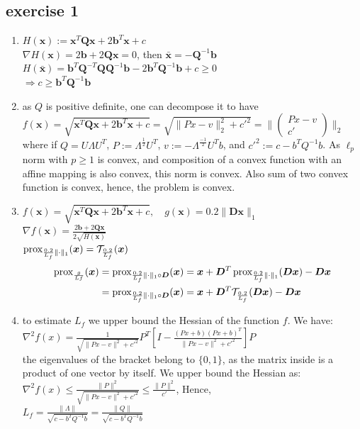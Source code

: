 \subsection{exercise 1}
\begin{enumerate}
    \item $H(\bm x) := \bm x^T \bm Q \bm x + 2 \bm b^T \bm x + c$ \\
    $\nabla H(\bm x) = 2 \bm b + 2 \bm Q \bm x = 0$, then $\bar{\bm x} = - \bm Q^{-1} \bm b$ \\
    $H(\bar{\bm x})=\bm b^T \bm Q^{-T} \bm Q \bm Q^{-1} \bm b - 2 \bm b^T \bm Q^{-1} \bm b + c \geq 0$ \\
    $\Rightarrow c \geq \bm b^T \bm Q^{-1} \bm b$

    \item as $Q$ is positive definite, one can decompose it to have\\
    $f(\bm x) = \sqrt{\bm x^T \bm Q \bm x + 2 \bm b^T \bm x + c} = \sqrt{\|Px - v\|_2^2+ c'^2} = \|\begin{pmatrix}
        Px-v \\
        c'
    \end{pmatrix}\|_2$\\
    where if $Q=U\Lambda U^T$, $P:=\Lambda^{\frac{1}{2}}U^T$, $v:=-\Lambda^{\frac{-1}{2}}U^Tb$, and $c'^2:=c-b^T Q^{-1} b$. As $\ell_p$ norm with $p \geq 1$ is convex, and composition of a convex function with an affine mapping is also convex, this norm is convex. Also sum of two convex function is convex, hence, the problem is convex.
    
    \item $f(\bm x) = \sqrt{\bm x^T \bm Q \bm x + 2 \bm b^T \bm x + c}, \quad g(\bm x) = 0.2 \|\bm D \bm x\|_1$\\
    $\nabla f(\bm x) = \frac{2 \bm b + 2 \bm Q \bm x}{2 \sqrt{H(\bm x)}}$\\
    $\operatorname{prox}_{\frac{0.2}{L_f} \|\cdot\|_1}(\bm x) = \mathcal{T}_{\frac{0.2}{L_f}}(\bm x)$
    \begin{align*}
        \operatorname{prox}_{\frac{g}{Lf}}(\bm x) &= \operatorname{prox}_{\frac{0.2}{L_f}\|\cdot\|_1 \circ \bm D}(\bm x) = \bm x + \bm D^T \operatorname{prox}_{\frac{0.2}{L_f} \|\cdot\|_1}(\bm D \bm x) - \bm D \bm x \\
        & = \operatorname{prox}_{\frac{0.2}{L_f} \|\cdot\|_1 \circ \bm D}(\bm x) = \bm x + \bm D^T \mathcal{T}_{\frac{0.2}{L_f}}(\bm D \bm x) - \bm D \bm x\\
    \end{align*}

    \item to estimate $L_f$ we upper bound the Hessian of the function $f$. We have:\\
    $\nabla^2 f(x) = \frac{1}{\sqrt{\|Px-v\|^2 + c'^2}}P^T \left[I - \frac{(Px+b)(Px+b)^T}{\|Px-v\|^2 + c'^2}\right]P$\\
    the eigenvalues of the bracket belong to $\{0,1\}$, as the matrix inside is a product of one vector by itself. We upper bound the Hessian as:
    $\nabla^2 f(x) \leq \frac{\|P\|^2}{\sqrt{\|Px-v\|^2 + c'^2}} \leq \frac{\|P\|^2}{c'}$, Hence,\\
    $L_f = \frac{\|\Lambda\|}{\sqrt{c-b^T Q^{-1} b}}=\frac{\|Q\|}{\sqrt{c-b^T Q^{-1} b}}$


\end{enumerate}
